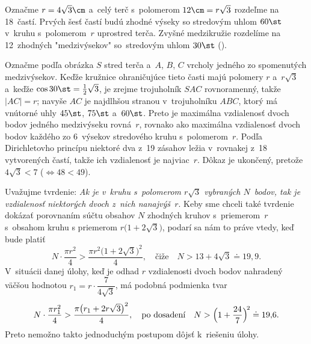{%
Označme $r=4\sqrt3\cm$ a~celý terč s~polomerom $12\cm=r\sqrt3$
rozdeľme na 18~častí. Prvých šesť častí budú zhodné výseky
so stredovým uhlom $60\st$ v~kruhu s~polomerom~$r$
uprostred terča. Zvyšné medzikružie rozdelíme na 12~zhodných
"medzivýsekov" so~stredovým uhlom $30\st$ (\obr).
%

Označme podľa obrázka $S$ stred terča a~$A$, $B$, $C$ vrcholy jedného
zo spomenutých medzivýsekov.
Keďže kružnice ohraničujúce tieto časti majú polomery $r$ a~$r\sqrt3$
a~keďže $\cos 30\st=\frac12\sqrt3$, je zrejme trojuholník $SAC$ rovnoramenný,
takže $|AC|=r$; navyše $AC$ je najdlhšou stranou v~trojuholníku $ABC$, ktorý
má vnútorné uhly $45\st$, $75\st$ a~$60\st$.
%
%
Preto je maximálna vzdialenosť dvoch bodov
jedného medzivýseku rovná~$r$, rovnako ako maximálna vzdialenosť dvoch
bodov každého zo 6~výsekov stredového kruhu s~polomerom~$r$. Podľa
Dirichletovho princípu niektoré dva z~19 zásahov ležia v~rovnakej z~18~
vytvorených častí, takže ich vzdialenosť je najviac~$r$.
Dôkaz je ukončený, pretože $4\sqrt3<7$ ($\Leftrightarrow 48<49$).

\poznamka
Uvažujme tvrdenie: {\sl Ak je v~kruhu s~polomerom
$r\sqrt3$ vybraných $N$~bodov, tak je vzdialenosť niektorých dvoch z~nich
nanajvýš~$r$}. Keby sme chceli také tvrdenie dokázať
porovnaním súčtu obsahov $N$ zhodných kruhov s~priemerom~$r$
s~obsahom kruhu s priemerom $r\bigl(1+2\sqrt3\bigr)$,
podarí sa nám to práve vtedy, keď bude platiť
$$
N\cdot\frac{\pi r^2}{4}>\frac{\pi
r^2\bigl(1+2\sqrt3\bigr)^2}{4},\quad\text{čiže}\quad
N>13+4\sqrt3\doteq19{,}9.
$$
V~situácii danej úlohy, keď je odhad $r$ vzdialenosti dvoch bodov
nahradený väčšou hodnotou $r_1=r\cdot\dfrac{7}{4\sqrt3}$,
má podobná podmienka tvar
$$
N\cdot\frac{\pi r_1^2}{4}>\frac{\pi
\bigl(r_1+2r\sqrt3\bigr)^2}{4},\quad\text{po dosadení}\quad
N>\Bigl(1+\frac{24}{7}\Bigr)^{\!2}\doteq 19{,}6.
$$
Preto nemožno takto jednoduchým postupom dôjsť k~riešeniu úlohy.
}

